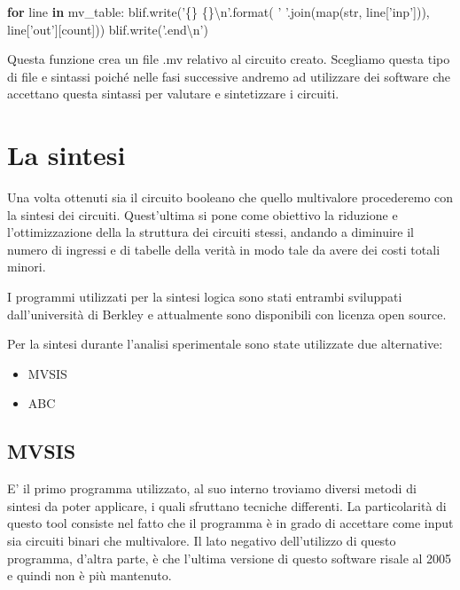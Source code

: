 \documentclass[italian,]{book}
\newenvironment{Shaded}{\begin{snugshade}}{\end{snugshade}}
\newcommand{\BuiltInTok}[1]{#1}
\newcommand{\CharTok}[1]{\textcolor[rgb]{0.31,0.60,0.02}{#1}}
\newcommand{\ControlFlowTok}[1]{\textcolor[rgb]{0.13,0.29,0.53}{\textbf{#1}}}
\newcommand{\KeywordTok}[1]{\textcolor[rgb]{0.13,0.29,0.53}{\textbf{#1}}}
\newcommand{\NormalTok}[1]{#1}
\newcommand{\SpecialCharTok}[1]{\textcolor[rgb]{0.00,0.00,0.00}{#1}}
\newcommand{\StringTok}[1]{\textcolor[rgb]{0.31,0.60,0.02}{#1}}
\providecommand{\tightlist}{%
  \setlength{\itemsep}{0pt}\setlength{\parskip}{0pt}}
\begin{document}
\begin{Shaded}
\begin{Highlighting}[]
    \ControlFlowTok{for}\NormalTok{ line }\KeywordTok{in}\NormalTok{ mv_table:}
\NormalTok{      blif.write(}\StringTok{'}\SpecialCharTok{\{\}}\StringTok{ }\SpecialCharTok{\{\}}\CharTok{\textbackslash{}n}\StringTok{'}\NormalTok{.}\BuiltInTok{format}\NormalTok{(}
        \StringTok{' '}\NormalTok{.join(}\BuiltInTok{map}\NormalTok{(}\BuiltInTok{str}\NormalTok{, line[}\StringTok{'inp'}\NormalTok{])), line[}\StringTok{'out'}\NormalTok{][count]))}
\NormalTok{  blif.write(}\StringTok{'.end}\CharTok{\textbackslash{}n}\StringTok{'}\NormalTok{)}
\end{Highlighting}
\end{Shaded}

Questa funzione crea un file .mv relativo al circuito creato. Scegliamo questa tipo di file e sintassi poiché nelle fasi successive andremo ad utilizzare dei software che accettano questa sintassi per valutare e sintetizzare i circuiti.

\newpage

\hypertarget{la-sintesi}{%
\section{La sintesi}\label{la-sintesi}}

Una volta ottenuti sia il circuito booleano che quello multivalore procederemo con la sintesi dei circuiti. Quest'ultima si pone come obiettivo la riduzione e l'ottimizzazione della la struttura dei circuiti stessi, andando a diminuire il numero di ingressi e di tabelle della verità in modo tale da avere dei costi totali minori.

I programmi utilizzati per la sintesi logica sono stati entrambi sviluppati dall'università di Berkley e attualmente sono disponibili con licenza open source.

Per la sintesi durante l'analisi sperimentale sono state utilizzate due alternative:

\begin{itemize}
\tightlist
\item
  MVSIS
\item
  ABC
\end{itemize}

\hypertarget{mvsis-1}{%
\subsection{MVSIS}\label{mvsis-1}}

E' il primo programma utilizzato, al suo interno troviamo diversi metodi di sintesi da poter applicare, i quali sfruttano tecniche differenti. La particolarità di questo tool consiste nel fatto che il programma è in grado di accettare come input sia circuiti binari che multivalore. Il lato negativo dell'utilizzo di questo programma, d'altra parte, è che l'ultima versione di questo software risale al 2005 e quindi non è più mantenuto.
\end{document}
